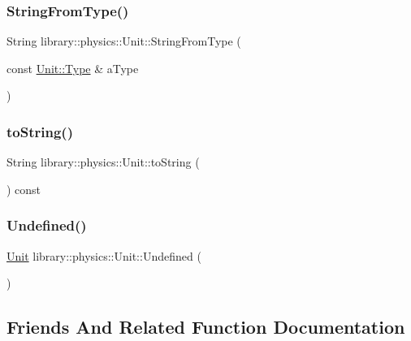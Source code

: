 \subsubsection{\texorpdfstring{String\+From\+Type()}{StringFromType()}}
{\footnotesize\ttfamily String library\+::physics\+::\+Unit\+::\+String\+From\+Type (\begin{DoxyParamCaption}\item[{const \hyperlink{classlibrary_1_1physics_1_1_unit_ab01b0024991fd80f3e5ef7c8282fccc1}{Unit\+::\+Type} \&}]{a\+Type }\end{DoxyParamCaption})\hspace{0.3cm}{\ttfamily [static]}}

\mbox{\label{classlibrary_1_1physics_1_1_unit_a8c7c1e6ec7a16eeb446e956dd19a3fb8}} 
\subsubsection{\texorpdfstring{to\+String()}{toString()}}
{\footnotesize\ttfamily String library\+::physics\+::\+Unit\+::to\+String (\begin{DoxyParamCaption}{ }\end{DoxyParamCaption}) const}

\mbox{\label{classlibrary_1_1physics_1_1_unit_a9fb6d8c10aefa9a13cff18cf6d6e5733}} 
\subsubsection{\texorpdfstring{Undefined()}{Undefined()}}
{\footnotesize\ttfamily \hyperlink{classlibrary_1_1physics_1_1_unit}{Unit} library\+::physics\+::\+Unit\+::\+Undefined (\begin{DoxyParamCaption}{ }\end{DoxyParamCaption})\hspace{0.3cm}{\ttfamily [static]}}



\subsection{Friends And Related Function Documentation}
\mbox{\label{classlibrary_1_1physics_1_1_unit_a70630a82d569152709a999efabdb3e4f}} 
